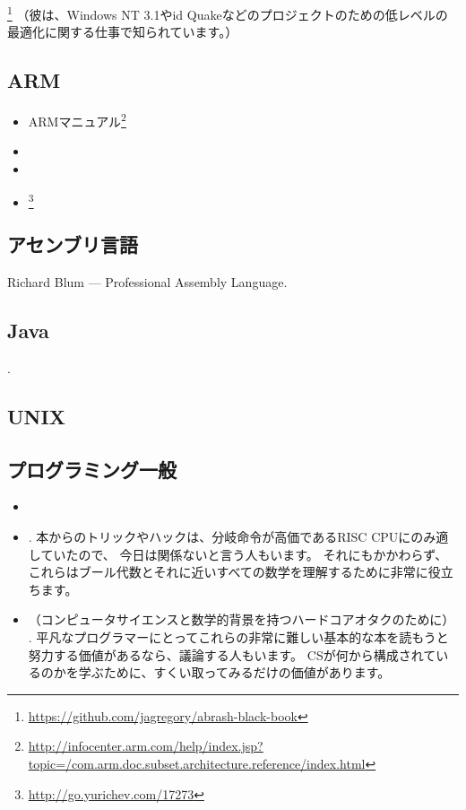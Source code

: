 \MAbrash\footnote{\AlsoAvailableAs \url{https://github.com/jagregory/abrash-black-book}}
（彼は、Windows NT 3.1やid Quakeなどのプロジェクトのための低レベルの最適化に関する仕事で知られています。）

\subsection{ARM}

\begin{itemize}
\item ARMマニュアル\footnote{\AlsoAvailableAs \url{http://infocenter.arm.com/help/index.jsp?topic=/com.arm.doc.subset.architecture.reference/index.html}}

\item \ARMSevenRef

\item \ARMSixFourRefURL

\item \ARMCookBook\footnote{\AlsoAvailableAs \url{http://go.yurichev.com/17273}}
\end{itemize}

\subsection{アセンブリ言語}

Richard Blum --- Professional Assembly Language.

\subsection{Java}

\JavaBook.

\subsection{UNIX}

\TAOUP

\subsection{プログラミング一般}

\begin{itemize}

\item \RobPikePractice

\item \HenryWarren.
本からのトリックやハックは、分岐命令が高価である\ac{RISC} \ac{CPU}にのみ適していたので、
今日は関係ないと言う人もいます。 
それにもかかわらず、これらはブール代数とそれに近いすべての数学を理解するために非常に役立ちます。

\item （コンピュータサイエンスと数学的背景を持つハードコアオタクのために） \TAOCP.
平凡なプログラマーにとってこれらの非常に難しい基本的な本を読もうと努力する価値があるなら、議論する人もいます。 
\ac{CS}が何から構成されているのかを学ぶために、すくい取ってみるだけの価値があります。

\end{itemize}

